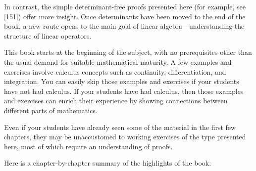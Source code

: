 In contrast, the simple determinant-free proofs presented here (for example, see \ref{151}) offer more insight.
Once determinants have been moved to the end of the book, a new route
opens to the main goal of linear algebra---understanding the structure
of linear operators.

This book starts at the beginning of the subject, with no prerequisites other than the usual demand for suitable mathematical maturity. A few examples and exercises involve calculus concepts such as continuity, differentiation, and integration. You can easily skip those examples and exercises if your students have not had calculus. If your students have had calculus, then those examples and exercises can enrich their experience by showing connections between different parts of mathematics.

Even if your students have already seen some of the material in the first few chapters, they may be unaccustomed to working exercises of the type presented here, most of which require an understanding of proofs.

Here is a chapter-by-chapter summary of the highlights of the book:


